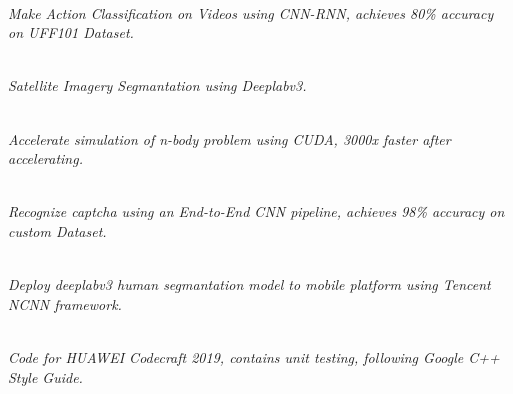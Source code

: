 \documentclass[10pt]{article}
\begin{document}
		\vspace{0.4cm}
		\vspace{-0.8cm}

		\begin{adjustwidth}{0.1cm}{0cm}
			\\
				\textit{Make Action Classification on Videos using CNN-RNN, achieves 80\% accuracy on UFF101 Dataset.}

			\vspace{0.1cm}
			\\
				\textit{Satellite Imagery Segmantation using Deeplabv3.}

			\vspace{0.1cm}
			\\
				\textit{Accelerate simulation of n-body problem using CUDA, 3000x faster after accelerating.}
			
			\vspace{0.1cm}
			\\
				\textit{Recognize captcha using an End-to-End CNN pipeline, achieves 98\% accuracy on custom Dataset.}
			
			\vspace{0.1cm}
			\\
				\textit{Deploy deeplabv3 human segmantation model to mobile platform using Tencent NCNN framework.}
			
			\vspace{0.1cm}
			\\
				\textit{Code for HUAWEI Codecraft 2019, contains unit testing, following Google C++ Style Guide.}
		\end{adjustwidth}
\end{document}
